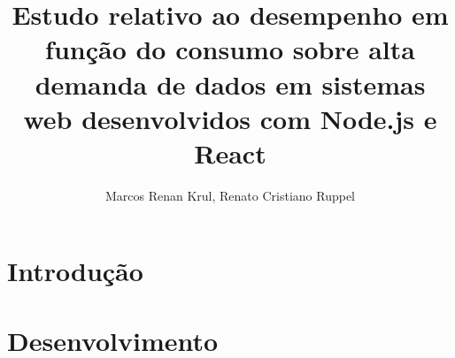 \documentclass[12pt]{article}
\title{Estudo relativo ao desempenho em função do consumo sobre alta demanda de dados em sistemas web desenvolvidos com Node.js e React}
\author{Marcos Renan Krul\inst{1}, Renato Cristiano Ruppel\inst{2}}
\begin{document}
 

\maketitle
     
\begin{resumo} 
 

\end{resumo}

\section{Introdução}


\section{Desenvolvimento}
\end{document}
